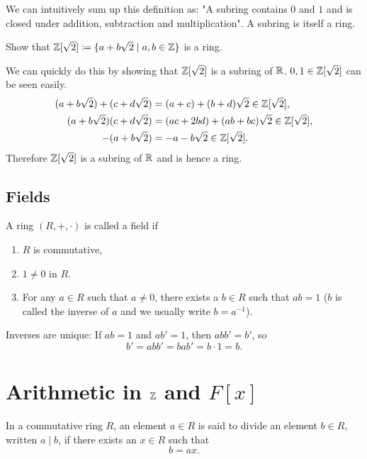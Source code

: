 \documentclass[10pt, a4paper]{article}
\begin{document}
We can intuitively sum up this definition as:
"A subring contains $0$ and $1$ and is closed under addition,
subtraction and multiplication".
A subring is itself a ring.

\begin{example}
    Show that $\mathbb{Z}[\sqrt{2}] \coloneqq \{a + b\sqrt{2}\mid a, b \in \mathbb{Z}\}$ is a ring.

    \begin{solution}
        We can quickly do this by showing that $\mathbb{Z}[\sqrt{2}]$ is a subring of $\mathbb{R}$.
        $0, 1 \in \mathbb{Z}[\sqrt{2}]$ can be seen easily.
        \begin{align*}
            (a + b\sqrt{2}) + (c + d\sqrt{2}) &= (a + c) + (b + d)\sqrt{2} \in \mathbb{Z}[\sqrt{2}], \\
            (a + b\sqrt{2})(c + d\sqrt{2}) &= (ac + 2bd) + (ab + bc)\sqrt{2} \in \mathbb{Z}[\sqrt{2}], \\
            -(a + b\sqrt{2}) &= -a - b\sqrt{2} \in \mathbb{Z}[\sqrt{2}].
        \end{align*}
        Therefore $\mathbb{Z}[\sqrt{2}]$ is a subring of $\mathbb{R}$ and is hence a ring.
    \end{solution}
\end{example}

\subsection{Fields}

\begin{definition}[Fields]
    A ring $(R, +, \cdot)$ is called a field if
    \begin{enumerate}[label = \roman*)]
        \item $R$ is commutative,

        \item $1 \neq 0$ in $R$.

        \item For any $a \in R$ such that $a \neq 0$,
        there exists a $b \in R$ such that $ab = 1$
        ($b$ is called the inverse of $a$ and we usually write $b = a ^ {-1}$).
    \end{enumerate}
\end{definition}
Inverses are unique:
If $ab = 1$ and $ab' = 1$,
then $abb' = b'$,
so
\[
b' = abb' = bab' = b \cdot 1 = b.
\]

\newpage

\section{Arithmetic in \texorpdfstring{$\mathbb{Z}$}{} and \texorpdfstring{$F[x]$}{}}
In a commutative ring $R$,
an element $a \in R$ is said to divide an element $b \in R$,
written $a \mid b$,
if there exists an $x \in R$ such that
\[
b = ax.
\]
\end{document}
